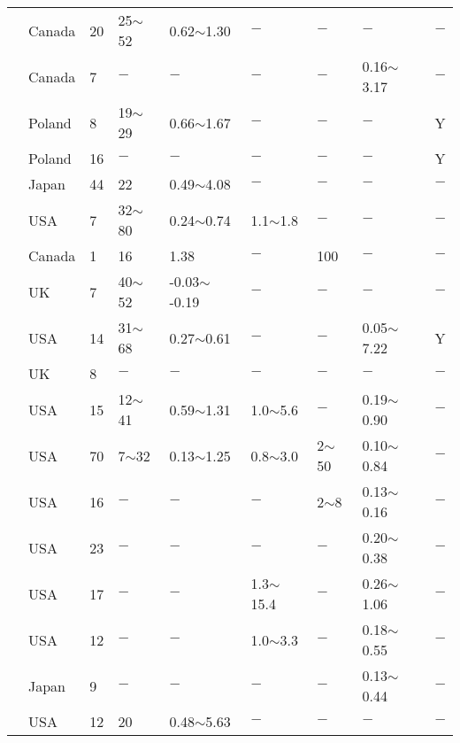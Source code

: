 {\begin{longtable}{lllllllll}
    \citet{Tavenas1978283} & Canada & 20    & 25$\sim$52 & 0.62$\sim$1.30 & $-$     & $-$     & $-$     & $-$ \\
    \citet{Tavenas1977319} & Canada & 7     & $-$     & $-$     & $-$     & $-$     & 0.16$\sim$3.17 & $-$ \\
    \citet{Tschuschke2005121} & Poland & 8     & 19$\sim$29 & 0.66$\sim$1.67 & $-$     & $-$     & $-$     & Y \\
    \citet{Tschuschke20103} & Poland & 16    & $-$     & $-$     & $-$     & $-$     & $-$     & Y \\
    \citet{Tsuchida1999543} & Japan & 44    & 22    & 0.49$\sim$4.08 & $-$     & $-$     & $-$     & $-$ \\
    \citet{Tumay198572} & USA   & 7     & 32$\sim$80 & 0.24$\sim$0.74 & 1.1$\sim$1.8 & $-$     & $-$     & $-$ \\
    \citet{Vaid197935} & Canada & 1     & 16    & 1.38  & $-$     & 100   & $-$     & $-$ \\
    \citet{Ward195933} & UK    & 7     & 40$\sim$52 & -0.03$\sim$-0.19 & $-$     & $-$     & $-$     & $-$ \\
    \citet{Wei20102} & USA   & 14    & 31$\sim$68 & 0.27$\sim$0.61 & $-$     & $-$     & 0.05$\sim$7.22 & Y \\
    \citet{Windle197737} & UK    & 8     & $-$     & $-$     & $-$     & $-$     & $-$     & $-$ \\
    \citet{Wroth19851} & USA   & 15    & 12$\sim$41 & 0.59$\sim$1.31 & 1.0$\sim$5.6 & $-$     & 0.19$\sim$0.90 & $-$ \\
    \citet{Wu19581} & USA   & 70    & 7$\sim$32  & 0.13$\sim$1.25 & 0.8$\sim$3.0 & 2$\sim$50  & 0.10$\sim$0.84 & $-$ \\
    \citet{Wu19621} & USA   & 16    & $-$     & $-$     & $-$     & 2$\sim$8   & 0.13$\sim$0.16 & $-$ \\
    \citet{Wu1963145} & USA   & 23    & $-$     & $-$     & $-$     & $-$     & 0.20$\sim$0.38 & $-$ \\
    \citet{Wu1975913} & USA   & 17    & $-$     & $-$     & 1.3$\sim$15.4 & $-$     & 0.26$\sim$1.06 & $-$ \\
    \citet{Wu1978889} & USA   & 12    & $-$     & $-$     & 1.0$\sim$3.3 & $-$     & 0.18$\sim$0.55 & $-$ \\
    \citet{YASUHARA198277} & Japan & 9     & $-$     & $-$     & $-$     & $-$     & 0.13$\sim$0.44 & $-$ \\
    \citet{Zreik1995472} & USA   & 12    & 20    & 0.48$\sim$5.63 & $-$     & $-$     & $-$     & $-$ \\
\end{longtable}}